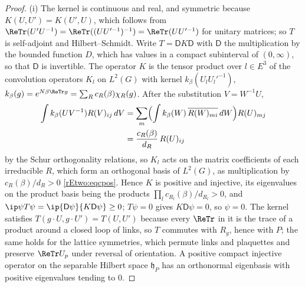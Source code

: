 \begin{proof}
(i) The kernel is continuous and real, and symmetric because $K(U,U')=
K(U',U)$, which follows from $\ReTr(U'U^{-1})=\ReTr((UU'^{-1})^{-1})=
\ReTr(UU'^{-1})$ for unitary matrices; so $T$ is self-adjoint and
Hilbert--Schmidt. Write $T=\mathsf DK\mathsf D$ with $\mathsf D$ the
multiplication by the bounded function $D$, which has values in a compact
subinterval of $(0,\infty)$, so that $\mathsf D$ is invertible. The
operator $K$ is the tensor product over $l\in E^3$ of the convolution
operators $K_l$ on $L^2(G)$ with kernel $k_\beta(U_lU_l'^{-1})$,
$k_\beta(g)=e^{N\beta\ReTr g}=\sum_Rc_R(\beta)\chi_R(g)$. After the
substitution $V=W^{-1}U$,
\begin{align*}
\int k_\beta(UV^{-1})R(V)_{ij}\,dV&=\sum_m\Bigl(\int k_\beta(W)\,
\overline{R(W)_{mi}}\,dW\Bigr)R(U)_{mj}\\
&=\frac{c_R(\beta)}{d_R}\,R(U)_{ij}
\end{align*}
by the Schur orthogonality relations, so $K_l$ acts on the matrix
coefficients of each irreducible $R$, which form an orthogonal basis of
$L^2(G)$, as multiplication by $c_R(\beta)/d_R>0$ \eqref{rEtwo:eqcpos}.
Hence $K$ is positive and injective, its eigenvalues on the product basis
being the products $\prod_lc_{R_l}(\beta)/d_{R_l}>0$, and $\ip\psi{T\psi}=
\ip{\mathsf D\psi}{K\mathsf D\psi}\ge0$; $T\psi=0$ gives $K\mathsf D\psi=0$,
so $\psi=0$. The kernel satisfies $T(g\cdot U,g\cdot U')=T(U,U')$ because
every $\ReTr$ in it is the trace of a product around a closed loop of
links, so $T$ commutes with $R_g$, hence with $P$; the same holds for the
lattice symmetries, which permute links and plaquettes and preserve
$\ReTr U_p$ under reversal of orientation. A positive compact injective
operator on the separable Hilbert space $\mathfrak h_P$ has an orthonormal
eigenbasis with positive eigenvalues tending to $0$.


\end{proof}
